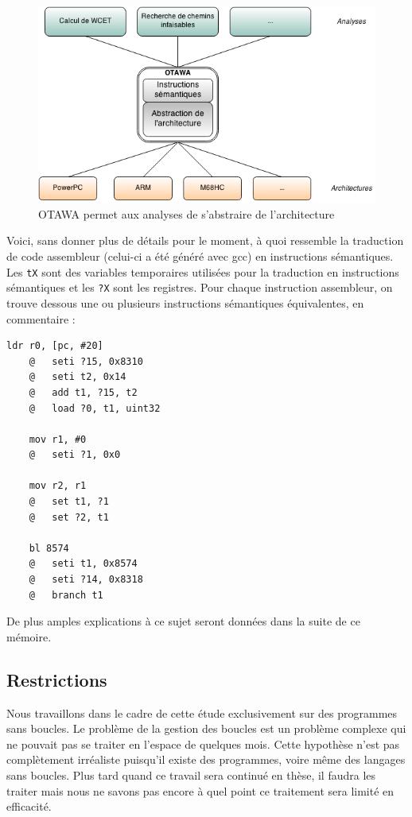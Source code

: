 \documentclass[french]{article}
\begin{document}
  \begin{figure}
    \centering
    \includegraphics[width=\textwidth]{pictures/otawa_abstraction_architecture.png}
    \caption{OTAWA permet aux analyses de s'abstraire de l'architecture}
    \label{abstraction architecture}
  \end{figure}

  Voici, sans donner plus de détails pour le moment, à quoi ressemble la traduction de code assembleur (celui-ci a été généré avec gcc) en instructions sémantiques. Les \texttt{tX} sont des variables temporaires utilisées pour la traduction en instructions sémantiques et les \texttt{?X} sont les registres. Pour chaque instruction assembleur, on trouve dessous une ou plusieurs instructions sémantiques équivalentes, en commentaire :

  \begin{lstlisting}[language={[ARM]Assembler}]
    ldr r0, [pc, #20]
    @	seti ?15, 0x8310
    @	seti t2, 0x14
    @	add t1, ?15, t2
    @	load ?0, t1, uint32

    mov r1, #0
    @	seti ?1, 0x0

    mov r2, r1
    @	set t1, ?1
    @	set ?2, t1

    bl 8574
    @	seti t1, 0x8574
    @	seti ?14, 0x8318
    @	branch t1
  \end{lstlisting}

  De plus amples explications à ce sujet seront données dans la suite de ce mémoire.

  \subsection{Restrictions}
  Nous travaillons dans le cadre de cette étude exclusivement sur des programmes sans boucles. Le problème de la gestion des boucles est un problème complexe qui ne pouvait pas se traiter en l'espace de quelques mois. Cette hypothèse n'est pas complètement irréaliste puisqu'il existe des programmes, voire même des langages sans boucles. Plus tard quand ce travail sera continué en thèse, il faudra les traiter mais nous ne savons pas encore à quel point ce traitement sera limité en efficacité.
\end{document}

